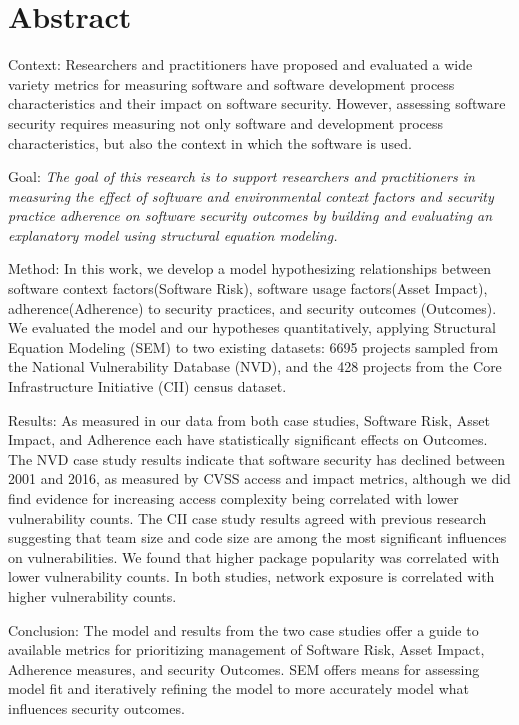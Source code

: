 \section{Abstract}
\label{sec:abstract}
Context: Researchers and practitioners have proposed and evaluated a wide variety metrics for measuring software and software development process characteristics and their impact on software security. However, assessing software security requires measuring not only software and development process characteristics, but also the context in which the software is used. 

Goal:  \textit{The goal of this research is to support researchers and practitioners in measuring the effect of software and environmental context factors and security practice adherence on software security outcomes by building and evaluating an explanatory model using structural equation modeling.} 

Method: In this work, we develop a model hypothesizing relationships between software context factors(Software Risk), software usage factors(Asset Impact), adherence(Adherence) to security practices, and security outcomes (Outcomes).  We evaluated the model and our hypotheses quantitatively, applying Structural Equation Modeling (SEM) to two existing datasets: 6695 projects sampled from the National Vulnerability Database (NVD), and the 428 projects from the Core Infrastructure Initiative (CII) census dataset.  

Results: As measured in our data from both case studies, Software Risk, Asset Impact, and Adherence each have statistically significant effects on Outcomes. The NVD case study results indicate that software security has declined between 2001 and 2016, as measured by CVSS access and impact metrics, although we did find evidence for increasing access complexity being correlated with lower vulnerability counts. The CII case study results agreed with previous research suggesting that team size and code size are among the most significant influences on vulnerabilities. We found that higher package popularity was correlated with lower vulnerability counts. In both studies, network exposure is correlated with higher vulnerability counts.

Conclusion: The model and results from the two case studies offer a guide to available metrics for prioritizing management of Software Risk, Asset Impact, Adherence measures, and security Outcomes. SEM offers means for assessing model fit and iteratively refining the model to more accurately model what influences security outcomes.